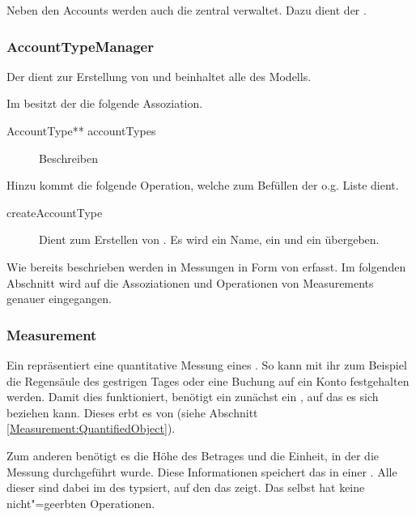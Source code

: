 Neben den Accounts werden auch die  zentral verwaltet. Dazu dient der .


\subsubsection{AccountTypeManager}
Der  dient zur Erstellung von  und beinhaltet alle  des Modells.

Im \MM besitzt der  die folgende Assoziation.
\begin{description}
	\item[AccountType** accountTypes] Beschreiben
\end{description}

Hinzu kommt die folgende Operation, welche zum Befüllen der o.g. Liste dient.
\begin{description}
	\item[createAccountType] Dient zum Erstellen von . 
	Es wird ein Name, ein  und ein  übergeben.
\end{description}

Wie bereits beschrieben werden in  Messungen in Form von  erfasst. 
Im folgenden Abschnitt wird auf die Assoziationen und Operationen von Measurements genauer eingegangen.


\subsubsection{Measurement}
Ein  repräsentiert eine quantitative Messung eines . So kann mit ihr zum Beispiel die Regensäule des gestrigen Tages
oder eine Buchung auf ein Konto festgehalten werden. Damit dies funktioniert, benötigt ein  zunächst ein , auf das es
sich beziehen kann. Dieses erbt es von  (siehe Abschnitt \ref{Measurement:QuantifiedObject}).

Zum anderen benötigt es die Höhe des Betrages und die Einheit, in der die Messung durchgeführt wurde. Diese Informationen speichert das 
in einer . Alle  dieser  sind dabei im  des  typsiert,
auf den das  zeigt. Das  selbst hat keine nicht"=geerbten Operationen.


